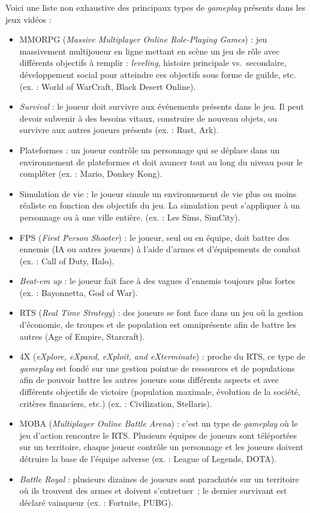 Voici une liste non exhaustive des principaux types de \emph{gameplay} présents dans les jeux vidéos :
\begin{itemize}
    \item MMORPG (\emph{Massive Multiplayer Online Role-Playing Games}) : jeu massivement multijoueur en ligne mettant en scène un jeu de rôle avec différents objectifs à remplir : \emph{leveling}, histoire principale vs.\ secondaire, développement social pour atteindre ces objectifs sous forme de guilde, etc. (ex. : World of WarCraft, Black Desert Online).
    \item \emph{Survival} : le joueur doit survivre aux événements présents dans le jeu. Il peut devoir subvenir à des besoins vitaux, construire de nouveau objets, ou survivre aux autres joueurs présents (ex. : Rust, Ark).
    \item Plateformes : un joueur contrôle un personnage qui se déplace dans un environnement de plateformes et doit avancer tout au long du niveau pour le compl\'eter (ex. : Mario, Donkey Kong).
    \item Simulation de vie : le joueur simule un environnement de vie plus ou moins réaliste en fonction des objectifs du jeu. La simulation peut s'appliquer à un personnage ou à une ville entière. (ex. : Les Sims, SimCity).
    \item FPS (\emph{First Person Shooter}) : le joueur, seul ou en équipe, doit battre des ennemis (IA ou autres joueurs) à l'aide d'armes et d'équipements de combat (ex. : Call of Duty, Halo).
    \item \emph{Beat-em up} : le joueur fait face à des vagues d'ennemis toujours plus fortes (ex. : Bayonnetta, God of War).
    \item RTS (\emph{Real Time Strategy}) : des joueurs se font face dans un jeu o\`u la gestion d'économie, de troupes et de population est omniprésente afin de battre les autres (Age of Empire, Starcraft).
    \item 4X (\emph{eXplore, eXpand, eXploit, and eXterminate}) : proche du RTS, ce type de \emph{gameplay} est fondé sur une gestion pointue de ressources et de populations afin de pouvoir battre les autres joueurs sous différents aspects et avec différents objectifs de victoire (population maximale, évolution de la société, critères financiers, etc.) (ex. : Civilization, Stellaris).
    \item MOBA (\emph{Multiplayer Online Battle Arena}) : c'est un type de \emph{gameplay} o\`u le jeu d'action rencontre le RTS. Plusieurs équipes de joueurs sont téléportées sur un territoire, chaque joueur contrôle un personnage et les joueurs doivent détruire la base de l'équipe adverse (ex. : League of Legends, DOTA).
    \item \emph{Battle Royal} : plusieurs dizaines de joueurs sont parachutés sur un territoire o\`u ils trouvent des armes et doivent s'entretuer~; le dernier survivant est déclaré vainqueur (ex. : Fortnite, PUBG).
\end{itemize}

